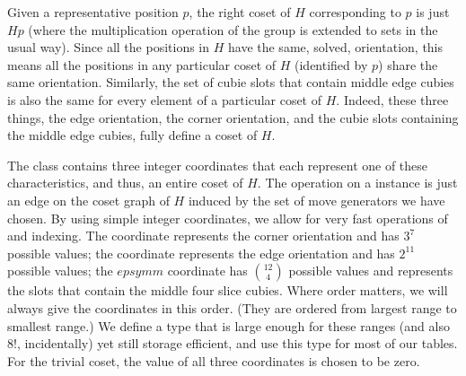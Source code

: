 Given a representative position $p$, the right coset of $H$
corresponding to $p$ is just $Hp$ (where the multiplication operation
of the group is extended to sets in the usual way).  Since all the
positions in $H$ have the same, solved, orientation, this means all
the positions in any particular coset of $H$ (identified by $p$) share
the same orientation.  Similarly, the set of cubie slots that contain
middle edge cubies is also the same for every element of a particular
coset of $H$.  Indeed, these three things, the edge orientation, the
corner orientation, and the cubie slots containing the middle edge
cubies, fully define a coset of $H$.

The  class contains three integer coordinates that each
represent one of these characteristics, and thus, an entire coset of
$H$.  The  operation on a  instance is just an
edge on
the coset graph of $H$ induced by the set of move generators we have
chosen.  By using simple integer coordinates, we allow for very fast
operations of  and indexing.  The  coordinate
represents
the corner orientation and has $3^7$ possible values; the 
coordinate represents the edge orientation and has $2^{11}$ possible
values; the $epsymm$ coordinate has $12\choose 4$ possible values and
represents the slots that contain the middle four slice cubies.  Where
order matters, we will always give the coordinates in this order.
(They are ordered from largest range to smallest range.)  We define a
type that is large enough for these ranges (and also $8!$,
incidentally) yet still storage efficient, and use this type for most
of our tables.  For the trivial coset, the value of all three
coordinates is chosen to be zero.

